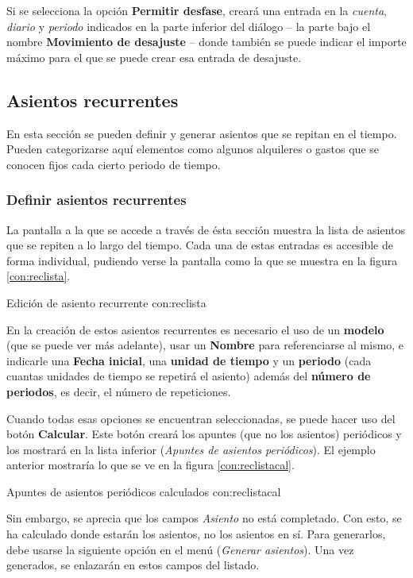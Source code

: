 Si se selecciona la opción \textbf{Permitir desfase}, creará una entrada en la \emph{cuenta}, \emph{diario} y \emph{periodo} indicados en la parte inferior del diálogo -- la parte bajo el nombre \textbf{Movimiento de desajuste} -- donde también se puede indicar el importe máximo para el que se puede crear esa entrada de desajuste.




\subsection{Asientos recurrentes}

En esta sección se pueden definir y generar asientos que se repitan en el tiempo. Pueden categorizarse aquí elementos como algunos alquileres o gastos que se conocen fijos cada cierto periodo de tiempo.

\subsubsection{Definir asientos recurrentes}

La pantalla a la que se accede a través de ésta sección muestra la lista de asientos que se repiten a lo largo del tiempo. Cada una de estas entradas es accesible de forma individual, pudiendo verse la pantalla como la que se muestra en la figura \ref{con:reclista}.

{Edición de asiento recurrente}
{con:reclista}

En la creación de estos asientos recurrentes es necesario el uso de un \textbf{modelo} (que se puede ver más adelante), usar un \textbf{Nombre} para referenciarse al mismo, e indicarle una \textbf{Fecha inicial}, una \textbf{unidad de tiempo} y un \textbf{ periodo} (cada cuantas unidades de tiempo se repetirá el asiento) además del \textbf{número de periodos}, es decir, el número de repeticiones.

Cuando todas esas opciones se encuentran seleccionadas, se puede hacer uso del botón \textbf{Calcular}. Este botón creará los apuntes (que no los asientos) periódicos y los mostrará en la lista inferior (\emph{Apuntes de asientos periódicos}). El ejemplo anterior mostraría lo que se ve en la figura \ref{con:reclistacal}.

{Apuntes de asientos periódicos calculados}
{con:reclistacal}

Sin embargo, se aprecia que los campos \emph{Asiento} no está completado. Con esto, se ha calculado donde estarán los asientos, no los asientos en sí. Para generarlos, debe usarse la siguiente opción en el menú (\emph{Generar asientos}). Una vez generados, se enlazarán en estos campos del listado.

